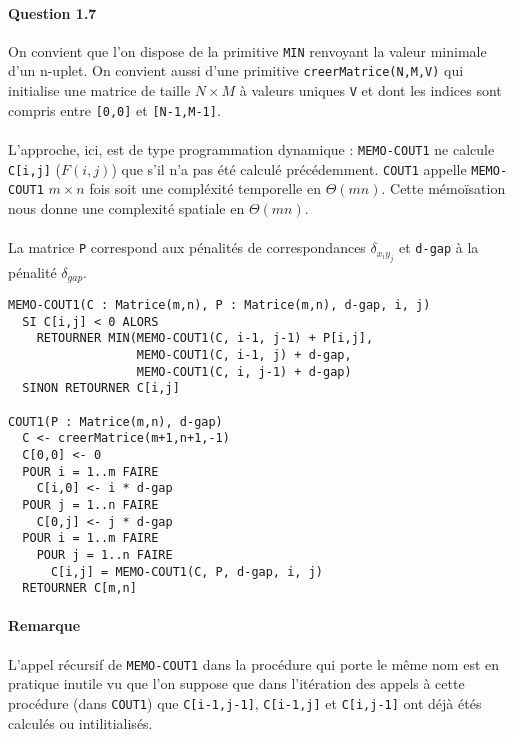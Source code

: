 \paragraph{Question 1.7}
On convient que l'on dispose de la primitive \verb'MIN' renvoyant la
valeur minimale d'un n-uplet. On convient aussi d'une primitive
\verb'creerMatrice(N,M,V)' qui initialise une matrice de taille
$N\times M$ \`a valeurs uniques \verb'V' et dont les indices sont
compris entre \verb'[0,0]' et \verb'[N-1,M-1]'.
\\\\
L'approche, ici, est de type programmation dynamique :
\verb'MEMO-COUT1' ne calcule \verb'C[i,j]' ($F(i,j)$) que s'il n'a pas
\'et\'e calcul\'e pr\'ec\'edemment. \verb'COUT1' appelle
\verb'MEMO-COUT1' $m\times n$ fois soit une compl\'exit\'e temporelle en
$\Theta(mn)$. Cette m\'emo\"isation nous donne une complexit\'e
spatiale en $\Theta(mn)$.
\\\\
La matrice \verb'P' correspond aux p\'enalit\'es de correspondances
$\delta_{x_iy_j}$ et \verb'd-gap' \`a la p\'enalit\'e $\delta_{gap}$.
\begin{verbatim}
MEMO-COUT1(C : Matrice(m,n), P : Matrice(m,n), d-gap, i, j)
  SI C[i,j] < 0 ALORS
    RETOURNER MIN(MEMO-COUT1(C, i-1, j-1) + P[i,j],
                  MEMO-COUT1(C, i-1, j) + d-gap,
                  MEMO-COUT1(C, i, j-1) + d-gap)
  SINON RETOURNER C[i,j]

COUT1(P : Matrice(m,n), d-gap)
  C <- creerMatrice(m+1,n+1,-1)
  C[0,0] <- 0
  POUR i = 1..m FAIRE
    C[i,0] <- i * d-gap
  POUR j = 1..n FAIRE
    C[0,j] <- j * d-gap
  POUR i = 1..m FAIRE
    POUR j = 1..n FAIRE
      C[i,j] = MEMO-COUT1(C, P, d-gap, i, j)
  RETOURNER C[m,n]
\end{verbatim}
\pagebreak
\paragraph{Remarque}
L'appel r\'ecursif de \verb'MEMO-COUT1' dans la proc\'edure qui porte
le m\^eme nom est en pratique inutile vu que l'on suppose que dans
l'it\'eration des appels \`a cette proc\'edure (dans \verb'COUT1') que
\verb'C[i-1,j-1]', \verb'C[i-1,j]' et \verb'C[i,j-1]' ont d\'ej\`a
\'et\'es calcul\'es ou intilitialis\'es.
